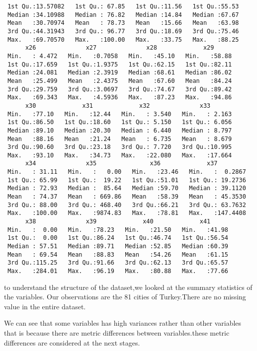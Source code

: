 \documentclass[12pt,twoside]{deuthesis}
\begin{document}
\begin{verbatim}
 1st Qu.:13.57082   1st Qu.: 67.85   1st Qu.:11.56   1st Qu.:55.53  
 Median :34.10988   Median : 76.82   Median :14.84   Median :67.67  
 Mean   :30.70974   Mean   : 78.73   Mean   :15.66   Mean   :63.98  
 3rd Qu.:44.31943   3rd Qu.: 96.77   3rd Qu.:18.69   3rd Qu.:75.46  
 Max.   :69.70570   Max.   :100.00   Max.   :33.75   Max.   :88.25  
      x26              x27              x28             x29       
 Min.   : 4.472   Min.   :0.7058   Min.   :45.10   Min.   :58.88  
 1st Qu.:17.659   1st Qu.:1.9375   1st Qu.:62.15   1st Qu.:82.11  
 Median :24.081   Median :2.3919   Median :68.61   Median :86.02  
 Mean   :25.499   Mean   :2.4375   Mean   :67.60   Mean   :84.24  
 3rd Qu.:29.759   3rd Qu.:3.0697   3rd Qu.:74.67   3rd Qu.:89.42  
 Max.   :69.343   Max.   :4.5936   Max.   :87.23   Max.   :94.86  
      x30             x31             x32              x33        
 Min.   :77.10   Min.   :12.44   Min.   : 3.540   Min.   : 2.163  
 1st Qu.:86.50   1st Qu.:18.60   1st Qu.: 5.150   1st Qu.: 6.056  
 Median :89.10   Median :20.30   Median : 6.440   Median : 8.797  
 Mean   :88.16   Mean   :21.24   Mean   : 6.735   Mean   : 8.679  
 3rd Qu.:90.60   3rd Qu.:23.18   3rd Qu.: 7.720   3rd Qu.:10.995  
 Max.   :93.10   Max.   :34.73   Max.   :22.080   Max.   :17.664  
      x34              x35               x36             x37          
 Min.   : 31.11   Min.   :   0.00   Min.   :23.46   Min.   :  0.2867  
 1st Qu.: 65.99   1st Qu.:  19.22   1st Qu.:51.01   1st Qu.: 19.2736  
 Median : 72.93   Median :  85.64   Median :59.70   Median : 39.1120  
 Mean   : 74.37   Mean   : 669.86   Mean   :58.39   Mean   : 45.3530  
 3rd Qu.: 88.00   3rd Qu.: 468.40   3rd Qu.:66.21   3rd Qu.: 63.7632  
 Max.   :100.00   Max.   :9874.83   Max.   :78.81   Max.   :147.4408  
      x38              x39             x40             x41       
 Min.   :  0.00   Min.   :78.23   Min.   :21.50   Min.   :41.98  
 1st Qu.:  0.00   1st Qu.:86.24   1st Qu.:46.74   1st Qu.:56.54  
 Median : 57.51   Median :89.71   Median :52.85   Median :60.39  
 Mean   : 69.54   Mean   :88.83   Mean   :54.26   Mean   :61.15  
 3rd Qu.:115.25   3rd Qu.:91.66   3rd Qu.:62.13   3rd Qu.:65.57  
 Max.   :284.01   Max.   :96.19   Max.   :80.88   Max.   :77.66  
\end{verbatim}
to understand the structure of the dataset,we looked at the summary statistics of the variables.
Our observations are the 81 cities of Turkey.There are no missing value in the entire dataset.

We can see that some variables has high variances rather than other variables that is because there are metric differences between variables.these metric differences are considered at the next stages.
\end{document}
